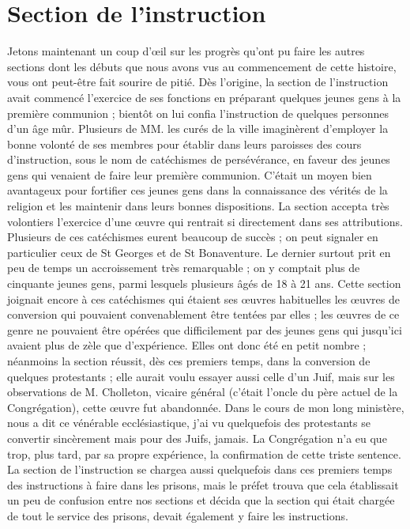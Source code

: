 \section*{Section de l'instruction}
Jetons maintenant un coup d'œil sur les progrès qu'ont pu faire les autres sections dont les débuts que nous avons vus au commencement de cette histoire, vous ont peut-être fait sourire de pitié. Dès l'origine, la section de l'instruction avait commencé l'exercice de ses fonctions en préparant quelques jeunes gens à la première communion ; bientôt on lui confia l'instruction de quelques personnes d'un âge mûr. Plusieurs de MM. les curés de la ville imaginèrent d'employer la bonne volonté de ses membres pour établir dans leurs paroisses des cours d'instruction, sous le nom de catéchismes de persévérance, en faveur des jeunes gens qui venaient de faire leur première communion. C'était un moyen bien avantageux pour fortifier ces jeunes gens dans la connaissance des vérités de la religion et les maintenir dans leurs bonnes dispositions. La section accepta très volontiers l'exercice d'une œuvre qui rentrait si directement dans ses attributions. Plusieurs de ces catéchismes eurent beaucoup de succès ; on peut signaler en particulier ceux de St Georges et de St Bonaventure. Le dernier surtout prit en peu de temps un accroissement très remarquable ; on y comptait plus de cinquante jeunes gens, parmi lesquels plusieurs âgés de 18 à 21 ans. Cette section joignait encore à ces catéchismes
qui étaient ses œuvres habituelles les œuvres de conversion qui pouvaient convenablement être tentées par elles ; les œuvres de ce genre ne pouvaient être opérées que difficilement par des jeunes gens qui jusqu'ici avaient plus de zèle que d'expérience. Elles ont donc été en petit nombre ; néanmoins la section réussit, dès ces premiers temps, dans la conversion de quelques protestants ; elle aurait voulu essayer aussi celle d'un Juif, mais sur les observations de M. Cholleton, vicaire général (c'était l'oncle du père actuel de la Congrégation), cette œuvre fut abandonnée. Dans le cours de mon long ministère, nous a dit ce vénérable ecclésiastique, j'ai vu quelquefois des protestants se convertir sincèrement mais pour des Juifs, jamais. La Congrégation n'a eu que trop, plus tard, par sa propre expérience, la confirmation de cette triste sentence. La section de l'instruction se chargea aussi quelquefois dans ces premiers temps des instructions à faire dans les prisons, mais le préfet trouva que cela établissait un peu de confusion entre nos sections et décida que la section qui était chargée de tout le service des prisons, devait également y faire les instructions.

